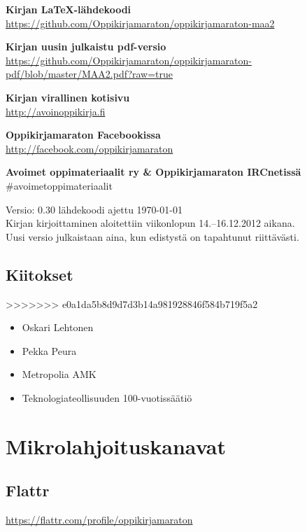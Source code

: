 \begin{minipage}[t]{0.5\textwidth}
\begin{minipage}[t]{0.5\textwidth}
\textbf{Kirjan LaTeX-lähdekoodi} \\
\url{https://github.com/Oppikirjamaraton/oppikirjamaraton-maa2}

\textbf{Kirjan uusin julkaistu pdf-versio} \\
\url{https://github.com/Oppikirjamaraton/oppikirjamaraton-pdf/blob/master/MAA2.pdf?raw=true}

\textbf{Kirjan virallinen kotisivu} \\
\url{http://avoinoppikirja.fi}

\textbf{Oppikirjamaraton Facebookissa} \\
\url{http://facebook.com/oppikirjamaraton}

\textbf{Avoimet oppimateriaalit ry \& Oppikirjamaraton IRCnetissä} \\
\#avoimetoppimateriaalit

Versio: 0.30 \qquad lähdekoodi ajettu \today \\
Kirjan kirjoittaminen aloitettiin viikonlopun 14.--16.12.2012 aikana. \\
Uusi versio julkaistaan aina, kun edistystä on tapahtunut riittävästi.

\subsection*{Kiitokset}
>>>>>>> e0a1da5b8d9d7d3b14a981928846f584b719f5a2
\begin{itemize}
\item Oskari Lehtonen %
\item Pekka Peura %
\item Metropolia AMK %
\item Teknologiateollisuuden 100-vuotissäätiö %
\end{itemize}

\newpage
\section*{Mikrolahjoituskanavat}

\subsection*{Flattr}
\url{https://flattr.com/profile/oppikirjamaraton}



\end{minipage}
\end{minipage}
